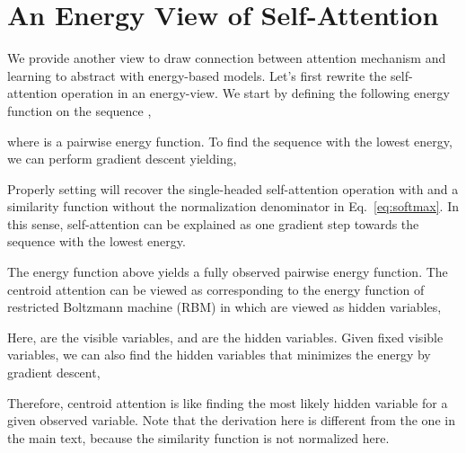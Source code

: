 \documentclass[english]{article}
\begin{document}





\newpage\clearpage
\appendix
\onecolumn
\section{An Energy View of Self-Attention} 
We provide another view to draw connection between attention mechanism and learning to abstract with energy-based models. Let's first rewrite the self-attention operation in an energy-view. We start by defining the following energy function on the sequence ,

where  is a pairwise energy function. To find the sequence with the lowest energy, we can perform gradient descent yielding,

Properly setting  will recover the single-headed self-attention operation with  
and a similarity function without the normalization denominator in Eq.~\eqref{eq:softmax}. In this sense, self-attention can be explained as one gradient step towards the sequence with the lowest energy.

The energy function above yields a fully observed pairwise energy function.  The centroid attention can be viewed as corresponding to the energy function of restricted Boltzmann machine (RBM) in which  are 
viewed as hidden variables, 

Here,  are the visible variables, and  are the hidden variables. Given fixed visible variables, we can also find the hidden variables that minimizes the energy by gradient descent,

Therefore, centroid attention is like finding the most likely hidden variable for a given observed variable.
Note that the derivation here is different from the one in the main text, because the similarity function is not normalized here. %
 
\end{document}
